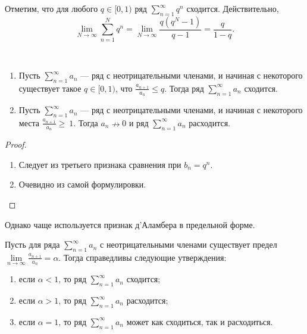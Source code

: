 \documentclass[a4paper, 12pt]{article}
\begin{document}
\begin{Comment}
	Отметим, что для любого $q \in [0,1)$ ряд $\sum\limits_{n=1}^{\infty} q^n$ сходится. Действительно, $$\lim\limits_{N\rightarrow\infty} \sum\limits_{n=1}^{N} q^n=\lim\limits_{N\rightarrow\infty}\frac{q(q^N-1)}{q-1} = \frac{q}{1-q}.$$
\end{Comment}

\begin{Test}\
		\begin{enumerate}
		\item 	Пусть $\sum\limits_{n=1}^{\infty} a_n$ --- ряд с неотрицательными членами, и начиная с некоторого существует такое $q \in [0, 1)$, что $\frac{a_{n+1}}{a_n} \leqslant q$. Тогда ряд $\sum\limits_{n=1}^{\infty} a_n$ сходится.
		\item Пусть $\sum\limits_{n=1}^{\infty} a_n$ --- ряд с неотрицательными членами, и начиная с некоторого места $\frac{a_{n+1}}{a_n} \geqslant~1$. Тогда $a_n \nrightarrow 0$ и ряд $\sum\limits_{n=1}^{\infty} a_n$ расходится.
	\end{enumerate}
\end{Test}

\begin{proof}
\ 
\begin{enumerate}
	\item 	Следует из третьего признака сравнения при $b_n = q^n$. 
	\item Очевидно из самой формулировки.
\end{enumerate}
\end{proof}

Однако чаще используется признак д'Аламбера в предельной форме.

\begin{Consequence}
Пусть для ряда	 $\sum\limits_{n=1}^{\infty} a_n$ с неотрицательными членами существует предел $\lim\limits_{n\rightarrow\infty} \frac{a_{n+1}}{a_n} = \alpha$. Тогда справедливы следующие утверждения:
\begin{enumerate}
	\item если $\alpha < 1$, то ряд $\sum\limits_{n=1}^{\infty} a_n$ сходится;
	\item если $\alpha > 1$, то ряд $\sum\limits_{n=1}^{\infty} a_n$ расходится;
	\item если $\alpha = 1$, то ряд $\sum\limits_{n=1}^{\infty} a_n$ может как сходиться, так и расходиться. 
\end{enumerate}
\end{Consequence}
\end{document}
